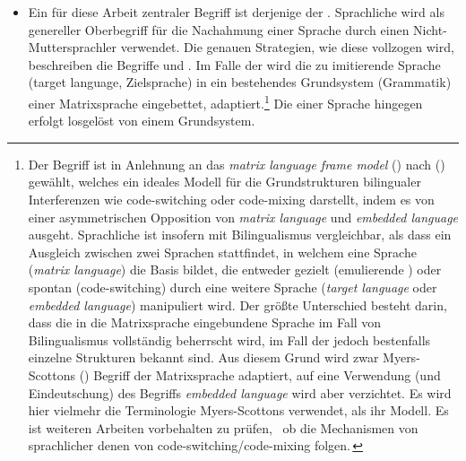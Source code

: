 \begin{itemize}
\newpage 	
\item Ein für diese Arbeit zentraler Begriff ist derjenige der . Sprachliche  wird als genereller Oberbegriff für die Nachahmung einer Sprache durch einen Nicht-Muttersprachler verwendet. Die genauen Strategien, wie diese  vollzogen wird, beschreiben die Begriffe  und . Im Falle der  wird die zu imitierende Sprache (target language, Zielsprache) in ein bestehendes Grundsystem (Grammatik) einer Matrixsprache eingebettet, adaptiert.\footnote{Der Begriff  ist in Anlehnung an das \textit{matrix language frame model} () nach 
\citeauthor{MyersScotton1993} (\citeyear{MyersScotton1993,MyersScotton2002}) gewählt, welches ein ideales Modell für die Grundstrukturen bilingualer Interferenzen wie code-switching 
oder code-mixing darstellt, indem es von einer asymmetrischen Opposition von \textit{matrix language} und \textit{embedded language} ausgeht. Sprachliche  ist insofern mit Bilingualismus vergleichbar, als dass ein Ausgleich zwischen zwei Sprachen stattfindet, in welchem eine Sprache (\textit{matrix language}) die Basis bildet, die entweder gezielt (emulierende ) oder spontan (code-switching) 
durch eine weitere Sprache (\textit{target language} oder \textit{embedded language}) manipuliert wird. Der größte Unterschied besteht darin, dass die in die Matrixsprache eingebundene Sprache im Fall von Bilingualismus vollständig beherrscht wird, im Fall der  jedoch bestenfalls einzelne Strukturen bekannt sind. Aus diesem Grund wird zwar Myers-Scottons (\citeyear{MyersScotton1993,MyersScotton2002}) Begriff der Matrixsprache adaptiert, auf eine Verwendung (und Eindeutschung) des Begriffs \textit{embedded language} wird aber  verzichtet. Es wird hier vielmehr die Terminologie Myers-Scottons verwendet, als ihr Modell. Es ist weiteren Arbeiten vorbehalten zu prüfen, \,%
ob die Mechanismen von sprachlicher  denen von code-switching/code-mixing folgen.\,%
} Die  einer Sprache hingegen erfolgt losgelöst von einem Grundsystem.

\end{itemize}
